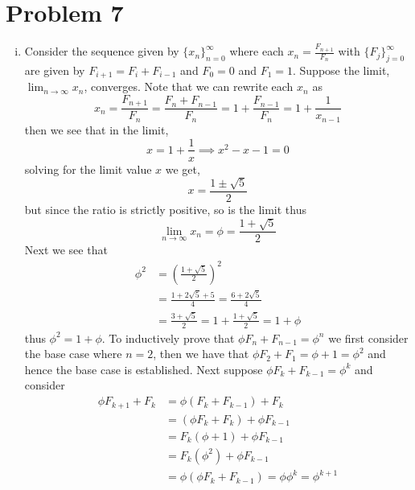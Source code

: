 \documentclass[12pt]{report}
\begin{document}
\section*{Problem 7}

\begin{enumerate}[(i)]
    \item Consider the sequence given by $\{x_n\}_{n=0}^\infty$ where each $x_n = \frac{F_{n+1}}{F_n}$ with $\{F_j\}_{j=0}^\infty$ are given by $F_{i+1} = F_{i} + F_{i-1}$ and $F_0 = 0$ and $F_1 = 1$. Suppose the limit, $\lim_{n \to \infty} x_n$, converges. Note that we can rewrite each $x_n$ as
\begin{equation*}
    x_n = \frac{F_{n+1}}{F_n} = \frac{F_{n} + F_{n-1}}{F_n} = 1 + \frac{F_{n-1}}{F_n} = 1 + \frac{1}{x_{n-1}}
\end{equation*}
then we see that in the limit,
\begin{equation*}
    x = 1 + \frac{1}{x} \implies x^2-x-1 = 0
\end{equation*}
solving for the limit value $x$ we get,
\begin{equation*}
    x = \frac{1 \pm \sqrt{5}}{2}
\end{equation*}
but since the ratio is strictly positive, so is the limit thus
\begin{equation*}
    \lim_{n \to \infty} x_n = \phi = \frac{1 + \sqrt{5}}{2}
\end{equation*}
Next we see that
\begin{align*}
    \phi^2 &= \left(\frac{1 + \sqrt{5}}{2}\right)^2 \\
    &= \frac{1 + 2\sqrt{5} + 5}{4} = \frac{6 + 2\sqrt{5}}{4} \\
    &= \frac{3 + \sqrt{5}}{2} = 1 + \frac{1 + \sqrt{5}}{2} = 1 + \phi
\end{align*}
thus $\phi^2 = 1 + \phi$. To inductively prove that $\phi F_n + F_{n-1} = \phi^n$ we first consider the base case where $n = 2$, then we have that $\phi F_2 + F_1 = \phi + 1 = \phi^2$ and hence the base case is established. Next suppose $\phi F_k + F_{k-1} = \phi^k$ and consider 
\begin{align*}
    \phi F_{k+1} + F_k &= \phi(F_k + F_{k-1}) + F_k \\
    &= (\phi F_k + F_{k}) + \phi F_{k-1} \\
    &= F_k(\phi + 1) + \phi F_{k-1} \\
    &= F_k(\phi^2) +  \phi F_{k-1} \\
    & = \phi (\phi F_k + F_{k-1}) = \phi \phi^k = \phi^{k+1}
\end{align*}

\end{enumerate}
\end{document}
